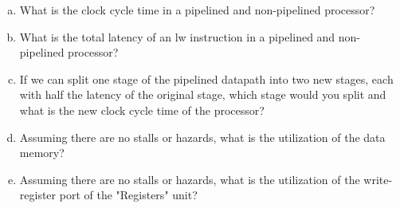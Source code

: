 \documentclass[11pt]{article}
\begin{document}
\begin{enumerate}[(a)]
    \item What is the clock cycle time in a pipelined and non-pipelined processor?
    \item What is the total latency of an lw instruction in a pipelined and non-pipelined processor?
    \item If we can split one stage of the pipelined datapath into two new stages, each with half the latency of the original stage, which stage would you split and what is the new clock cycle time of the processor?
    \item Assuming there are no stalls or hazards, what is the utilization of the data memory?
    \item Assuming there are no stalls or hazards, what is the utilization of the write-register port of the "Registers" unit?

\end{enumerate}
\end{document}
